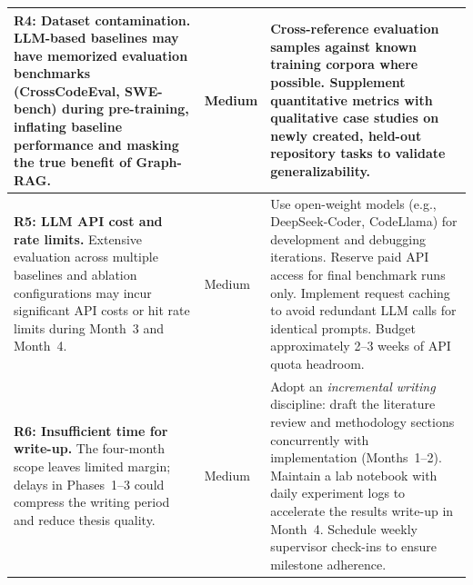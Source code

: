 \documentclass[11pt, a4paper]{article}
\begin{document}
\begin{table}
\begin{tabular}{@{}p{5cm} p{2cm} p{6.7cm}@{}}
\hline
\textbf{R4: Dataset contamination.} LLM-based baselines may have memorized evaluation benchmarks (CrossCodeEval, SWE-bench) during pre-training, inflating baseline performance and masking the true benefit of Graph-RAG. & Medium & Cross-reference evaluation samples against known training corpora where possible. Supplement quantitative metrics with qualitative case studies on newly created, held-out repository tasks to validate generalizability. \\
\hline
\textbf{R5: LLM API cost and rate limits.} Extensive evaluation across multiple baselines and ablation configurations may incur significant API costs or hit rate limits during Month~3 and Month~4. & Medium & Use open-weight models (e.g., DeepSeek-Coder, CodeLlama) for development and debugging iterations. Reserve paid API access for final benchmark runs only. Implement request caching to avoid redundant LLM calls for identical prompts. Budget approximately 2--3 weeks of API quota headroom. \\
\hline
\textbf{R6: Insufficient time for write-up.} The four-month scope leaves limited margin; delays in Phases~1--3 could compress the writing period and reduce thesis quality. & Medium & Adopt an \textit{incremental writing} discipline: draft the literature review and methodology sections concurrently with implementation (Months~1--2). Maintain a lab notebook with daily experiment logs to accelerate the results write-up in Month~4. Schedule weekly supervisor check-ins to ensure milestone adherence. \\
\bottomrule
\end{tabular}
\end{table}

\newpage
\printbibliography[title={Reference List}]
\end{document}
